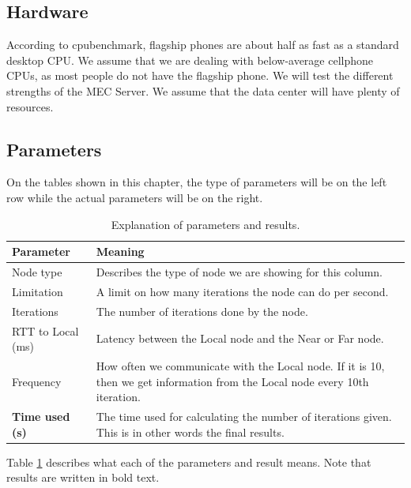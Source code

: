 \subsection{Hardware}
According to cpubenchmark\cite{noauthor_passmark_nodate}, flagship phones are about half as fast as a standard desktop CPU. We assume that we are dealing with below-average cellphone CPUs, as most people do not have the flagship phone. We will test the different strengths of the MEC Server. We assume that the data center will have plenty of resources. 


\subsection{Parameters}
On the tables shown in this chapter, the type of parameters will be on the left row while the actual parameters will be on the right.
\renewcommand{\arraystretch}{1.5}
\begin{table}[h!]
    \centering
    \begin{tabular}{l|p{12cm}}
        
        Parameter &  Meaning\\
        \hline
        Node type & Describes the type of node we are showing for this column. \\

        Limitation & A limit on how many iterations the node can do per second. \\

        Iterations & The number of iterations done by the node. \\

        RTT to Local (ms) & Latency between the Local node and the Near or Far node. \\
        
        Frequency & How often we communicate with the Local node. If it is 10, then we get information from the Local node every 10th iteration. \\
        \hline
        \textbf{Time used (s)} & The time used for calculating the number of iterations given. This is in other words the final results. \\
    \end{tabular}
    \caption{Explanation of parameters and results.}
    \label{tab:parameter_explanation}
\end{table}
\renewcommand{\arraystretch}{1.2}

Table \ref{tab:parameter_explanation} describes what each of the parameters and result means. Note that results are written in bold text.

